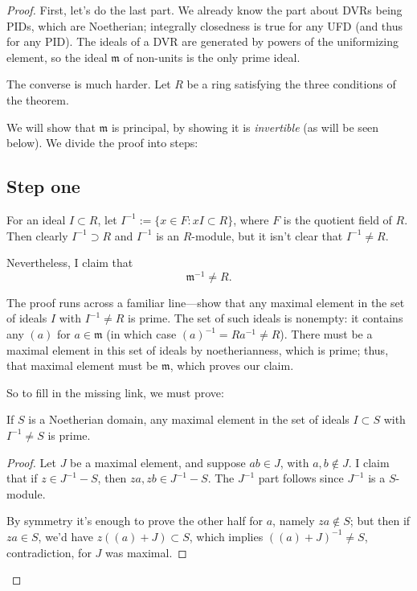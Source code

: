 \begin{proof}
First, let's do the last part. 
We already know the part about DVRs being PIDs, which are Noetherian; integrally closedness is true for any UFD (and thus for any PID).  The  ideals of a DVR are generated by powers of the uniformizing element, so the ideal $\mathfrak{m}$ of non-units is the only prime ideal. 

The converse is much harder.  Let $R$ be a ring satisfying the three conditions of the theorem.

We will show that $\mathfrak{m}$ is principal, by showing it is \emph{invertible} (as will be seen below).   We divide the proof into steps:

\subsection{Step one}
For an ideal $I \subset R$, let $I^{-1} := \{ x \in F: xI \subset R \}$, where $F$ is the quotient field of $R$.  Then clearly $I^{-1} \supset R$ and $I^{-1}$ is an $R$-module, but it isn't clear that $I^{-1} \neq R$.  

Nevertheless, I claim that  \[ \boxed{\mathfrak{m}^{-1} \neq R.}\]

The proof runs across a familiar line---show that any maximal element in the set of ideals $I$ with $I^{-1} \neq R$ is prime. 
The set of such ideals is nonempty: it contains   any $(a)$ for $a \in \mathfrak{m}$ (in which case $(a)^{-1} = Ra^{-1} \neq R$).  
There must be a maximal element in this set of ideals by noetherianness, which is prime; thus,  that maximal element must be $\mathfrak{m}$, which proves our claim.

So to fill in the missing link, we must prove:
\begin{lemma} If $S$ is a Noetherian domain, any maximal element in the set of ideals $I \subset S$ with $I^{-1} \neq S$ is prime.
\end{lemma}

\begin{proof}
Let $J$ be a maximal element, and suppose $ab \in J$, with  $a,b \notin J$.  I claim that if $z \in J^{-1} - S$, then $za, zb \in J^{-1} - S$.  The $J^{-1}$ part follows since $J^{-1}$ is a $S$-module.

By symmetry it's enough to prove the other half for $a$, namely $za \notin S$; but then if $za \in S$, we'd have $z( (a) + J ) \subset S$, which implies $ ( (a) + J)^{-1} \neq S$, contradiction, for $J$ was maximal.


\end{proof}
\end{proof}
